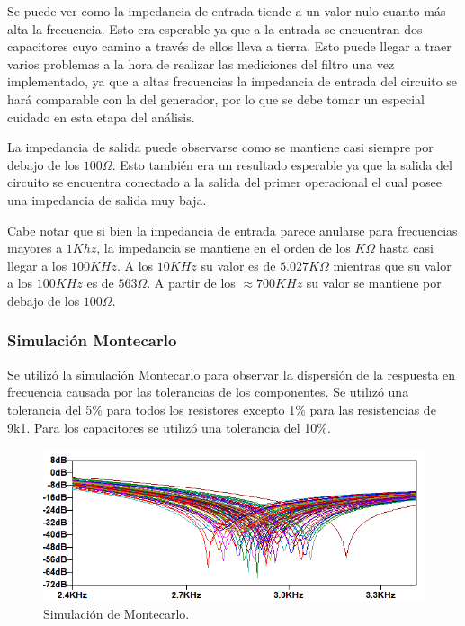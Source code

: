 Se puede ver como la impedancia de entrada tiende a un valor nulo cuanto más alta la frecuencia. Esto era esperable ya que a la entrada se encuentran dos capacitores cuyo camino a través de ellos lleva a tierra. Esto puede llegar a traer varios problemas a la hora de realizar las mediciones del filtro una vez implementado, ya que a altas frecuencias la impedancia de entrada del circuito se hará comparable con la del generador, por lo que se debe tomar un especial cuidado en esta etapa del análisis.

La impedancia de salida puede observarse como se mantiene casi siempre por debajo de los $100\Omega$. Esto también era un resultado esperable ya que la salida del circuito se encuentra conectado a la salida del primer operacional el cual posee una impedancia de salida muy baja.

Cabe notar que si bien la impedancia de entrada parece anularse para frecuencias mayores a $1Khz$, la impedancia se mantiene en el orden de los $K\Omega$ hasta casi llegar a los $100KHz$. A los $10KHz$ su valor es de $5.027K\Omega$ mientras que su valor a los $100KHz$ es de $563\Omega$. A partir de los $\approx 700KHz$ su valor se mantiene por debajo de los $100\Omega$.

\subsubsection{Simulación Montecarlo}
\label{sec:mont}
Se utilizó la simulación Montecarlo para observar la dispersión de la respuesta en frecuencia causada por las tolerancias de los componentes. Se utilizó una tolerancia del 5\% para todos los resistores excepto 1\% para las resistencias de 9k1. Para los capacitores se utilizó una tolerancia del 10\%.

\begin{figure}[H]
	\centering
	\includegraphics[width=\textwidth]{Imagenes1/Montecarlo1.PNG}
	\caption{Simulación de Montecarlo.}
	\label{fig:montecarlo}
\end{figure}


